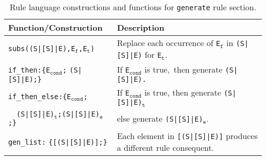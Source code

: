 \documentclass[svgnames,usenames,preprint,nocopyrightspace]{sigplanconf}
\begin{document}
\begin{table*}[t]
  \begin{center}
    \begin{tabular}{| l  l |}
      \hline
      \textbf{Function/Construction} & \textbf{Description}\\
      \hline
      \texttt{subs((S|[S]|E),E$_\mathtt{f}$,E$_\mathtt{t}$)} 
      	& Replace each occurrence of \texttt{E$_\mathtt{f}$} in
\texttt{(S|[S]|E)} for \texttt{E$_\mathtt{t}$}.\\
      \hline
\texttt{if\_then:\{E$_\mathtt{cond}$;} 
     \texttt{(S|[S]|E);\}}
       & If \texttt{E$_\mathtt{cond}$} is true,~then generate \texttt{(S|[S]|E).}\\
     \hline
\texttt{if\_then\_else:}\texttt{\{E$_\mathtt{cond}$;}&If \texttt{E$_\mathtt{cond}$} is true, then generate \texttt{(S|[S]|E)$_\mathtt{t}$}\\		
\texttt{~~(S|[S]|E)$_\mathtt{t}$;}\texttt{(S|[S]|E)$_\mathtt{e}$;\}} &
\hspace*{6.2em}else generate  \texttt{(S|[S]|E)$_\mathtt{e}$}.\\
      \hline
\texttt{gen\_list:}  \texttt{\{[(S|[S]|E)];\}}
      	&  Each element in \texttt{[(S|[S]|E)]} produces a different rule consequent.\\
      \hline
    \end{tabular}
  \end{center}
  \caption{Rule language constructions and functions for \texttt{generate} rule section.}
  \label{tab:funsgenerate}
\end{table*}
\end{document}
